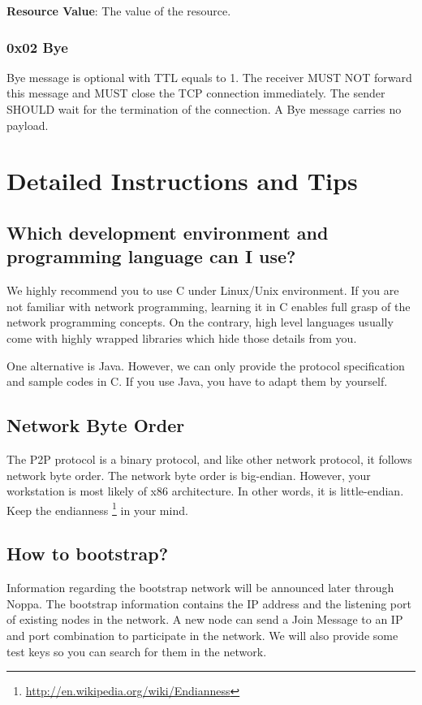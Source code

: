 \documentclass[12pt, a4paper]{article}
\begin{document}
\textbf{Resource Value}: The value of the resource.

\subsubsection{0x02 Bye}
Bye message is optional with TTL equals to 1.
The receiver MUST NOT forward this message and MUST close the TCP connection immediately.
The sender SHOULD wait for the termination of the connection.
A Bye message carries no payload.

\section{Detailed Instructions and Tips}
\subsection*{Which development environment and programming language can I use?}
We highly recommend you to use C under Linux/Unix environment.
If you are not familiar with network programming, learning it in C enables full grasp of the network programming concepts.
On the contrary, high level languages usually come with highly wrapped libraries which hide those details from you.

One alternative is Java.
However, we can only provide the protocol specification and sample codes in C.
If you use Java, you have to adapt them by yourself.

\subsection*{Network Byte Order}
The P2P protocol is a binary protocol, and like other network protocol, it follows network byte order.
The network byte order is big-endian.
However, your workstation is most likely of x86 architecture.
In other words, it is little-endian.
Keep the endianness \footnote{\url{http://en.wikipedia.org/wiki/Endianness}} in your mind.

\subsection*{How to bootstrap?}
Information regarding the bootstrap network will be announced later through Noppa.
The bootstrap information contains the IP address and the listening port of existing nodes in the network.
A new node can send a Join Message to an IP and port combination to participate in the network.
We will also provide some test keys so you can search for them in the network.
\end{document}
